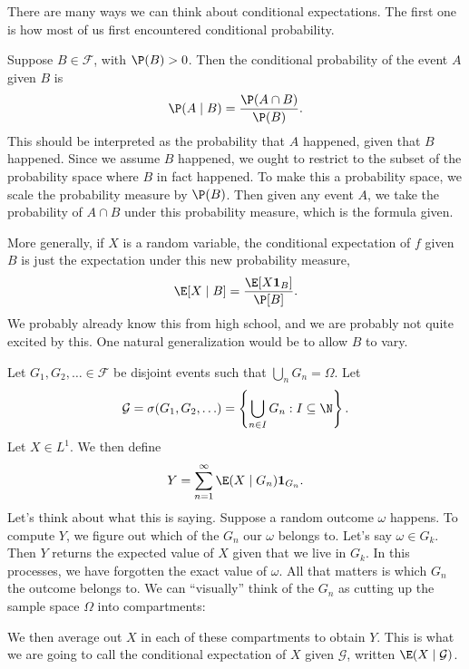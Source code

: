 \documentclass[a4paper]{article}
\begin{document}
There are many ways we can think about conditional expectations. The first one is how most of us first encountered conditional probability.

Suppose $B \in \mathcal{F}$, with $\P(B) > 0$. Then the conditional probability of the event $A$ given $B$ is
\[
  \P(A \mid B) = \frac{\P(A \cap B)}{\P(B)}.
\]
This should be interpreted as the probability that $A$ happened, given that $B$ happened. Since we assume $B$ happened, we ought to restrict to the subset of the probability space where $B$ in fact happened. To make this a probability space, we scale the probability measure by $\P(B)$. Then given any event $A$, we take the probability of $A \cap B$ under this probability measure, which is the formula given.

More generally, if $X$ is a random variable, the conditional expectation of $f$ given $B$ is just the expectation under this new probability measure,
\[
  \E[X \mid B] = \frac{\E[X \mathbf{1}_B]}{\P[B]}.
\]
We probably already know this from high school, and we are probably not quite excited by this. One natural generalization would be to allow $B$ to vary.

Let $G_1, G_2, \ldots \in \mathcal{F}$ be disjoint events such that $\bigcup_n G_n = \Omega$. Let
\[
  \mathcal{G} = \sigma(G_1, G_2, \ldots) = \left\{\bigcup_{n \in I} G_n: I \subseteq \N\right\}. %
\]
Let $X \in L^1$. We then define
\[
  Y = \sum_{n = 1}^\infty \E(X \mid G_n) \mathbf{1}_{G_n}.
\]
Let's think about what this is saying. Suppose a random outcome $\omega$ happens. To compute $Y$, we figure out which of the $G_n$ our $\omega$ belongs to. Let's say $\omega \in G_k$. Then $Y$ returns the expected value of $X$ given that we live in $G_k$. In this processes, we have forgotten the exact value of $\omega$. All that matters is which $G_n$ the outcome belongs to. We can ``visually'' think of the $G_n$ as cutting up the sample space $\Omega$ into compartments:
\begin{center}
\end{center}
We then average out $X$ in each of these compartments to obtain $Y$. This is what we are going to call the conditional expectation of $X$ given $\mathcal{G}$, written $\E(X \mid \mathcal{G})$.
\end{document}
